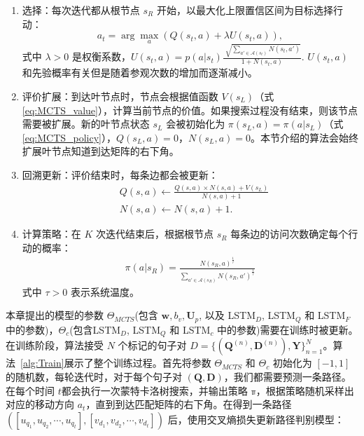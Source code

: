 \begin{enumerate}
	\item 选择：每次迭代都从根节点 $s_R$ 开始，以最大化上限置信区间为目标选择行动：
\begin{equation}\label{eq:Selection}
  a_t = \arg\max_a (Q(s_t, a) + \lambda U(s_t, a)),
\end{equation}
式中 $\lambda >0$ 是权衡系数，$U(s_t, a) =  p(a|s_t)\frac{\sqrt[]{\sum_{a'\in\mathcal{A}(s_t)} N(s_t, a')}}{1 + N(s_t, a)}$. $U(s_t, a)$ 和先验概率有关但是随着参观次数的增加而逐渐减小。

	\item 评价扩展：到达叶节点时，节点会根据值函数 $V(s_L)$（式\ref{eq:MCTS_value}），计算当前节点的价值。如果搜索过程没有结束，则该节点需要被扩展。新的叶节点状态 $s_L$ 会被初始化为 $\pi(s_L,a) = \pi(a|s_L)$（式\ref{eq:MCTS_policy}），$Q(s_L,a) = 0$，$N(s_L,a) = 0$。本节介绍的算法会始终扩展叶节点知道到达矩阵的右下角。
	
	\item 回溯更新：评价结束时，每条边都会被更新：
\begin{equation}
\label{eq:back update}
\begin{aligned}
	&Q(s, a) \leftarrow  \frac{Q(s, a) \times N(s, a) + V(s_L)}{N(s, a) + 1}\\
 	&N(s, a) \leftarrow  N(s, a) + 1.
\end{aligned}
\end{equation}
	
	\item 计算策略：在 $K$ 次迭代结束后，根据根节点 $s_R$ 每条边的访问次数确定每个行动的概率：
	\begin{equation}
\label{eq:SearchProb}
\begin{aligned}
	\pi(a|s_R) = \frac{N(s_R, a)^{\frac{1}{\tau}}}{\sum_{a'\in\mathcal{A}(s_R)} N(s_R, a')^{\frac{1}{\tau}}}
\end{aligned}
\end{equation}
式中 $\tau>0$ 表示系统温度。	
\end{enumerate}


本章提出的模型的参数 $\Theta_{MCTS}$(包含 $\mathbf{w}, b_v, \mathbf{U}_p$, 以及 LSTM$_D$, LSTM$_Q$ 和 LSTM$_F$中的参数)，$\Theta_{c}$(包含LSTM$_D$, LSTM$_Q$ 和 LSTM$_c$ 中的参数)需要在训练时被更新。在训练阶段，算法接受 $N$ 个标记的句子对 $D = \{ (\mathbf{Q}^{(n)}, \mathbf{D}^{(n)}), \mathbf{Y}\}_{n=1}^{N}$。算法~\ref{alg:Train}展示了整个训练过程。首先将参数  $\Theta_{MCTS}$ 和 $\Theta_{c}$ 初始化为 $[-1, 1]$ 的随机数，每轮迭代时，对于每个句子对 $(\mathbf{Q}, \mathbf{D})$，我们都需要预测一条路径。在每个时间 $t$都会执行一次蒙特卡洛树搜索，并输出策略 $\mathbb{\pi}$，根据策略随机采样出对应的移动方向 $a_t$，直到到达匹配矩阵的右下角。在得到一条路径 $([u_{q_1}, u_{q_2}, \cdots, u_{q_t}], [v_{d_1}, v_{d_2}, \cdots, v_{d_t}])$ 后，使用交叉熵损失更新路径判别模型：

